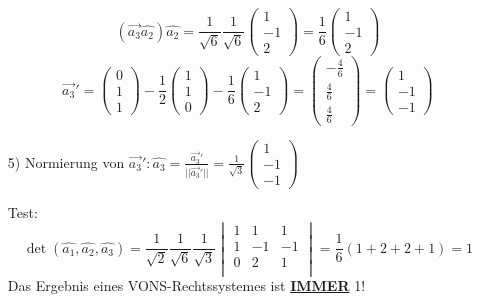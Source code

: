 \documentclass{article}
\begin{document}
\begin{itemize}
\begin{equation*}
        \end{equation*}
        \begin{equation*}
            \left(\vec{a_3}\hat{a_2}\right)\hat{a_2}=\frac{1}{\sqrt{6}}\frac{1}{\sqrt{6}}\left(\begin{array}{c}1 \\ -1 \\ 2\end{array}\right)=\frac{1}{6}\left(\begin{array}{c}1 \\ -1 \\ 2\end{array}\right)
        \end{equation*}
        \begin{equation*}
            \vec{a_3}'=\left(\begin{array}{c}0 \\ 1 \\ 1\end{array}\right)-\frac{1}{2}\left(\begin{array}{c}1 \\ 1 \\ 0\end{array}\right)-\frac{1}{6}\left(\begin{array}{c}1 \\ -1 \\ 2\end{array}\right)=\left(\begin{array}{c}-\frac{4}{6} \\ \frac{4}{6} \\ \frac{4}{6}\end{array}\right)=\left(\begin{array}{c}1 \\ -1 \\ -1\end{array}\right)
        \end{equation*}
    \item[5)] Normierung von $\vec{a_3}': \hat{a_3}=\frac{\vec{a_3}'}{||\vec{a_3}'||}=\frac{1}{\sqrt{3}}\left(\begin{array}{c}1 \\ -1 \\ -1\end{array}\right)$
    \item[Test:] \begin{equation*}
        \det\left(\hat{a_1},\hat{a_2},\hat{a_3}\right)=\frac{1}{\sqrt{2}}\frac{1}{\sqrt{6}}\frac{1}{\sqrt{3}}\begin{vmatrix} 

            1 & 1  & 1 \\ 
    
            1 & -1 & -1 \\ 
    
            0 &  2 & 1 \\  
    
        \end{vmatrix}=\frac{1}{6}\left(1+2+2+1\right)=1
    \end{equation*} 
    Das Ergebnis eines VONS-Rechtssystemes ist \textbf{\underline{IMMER}} 1!
\end{itemize}
\end{document}
